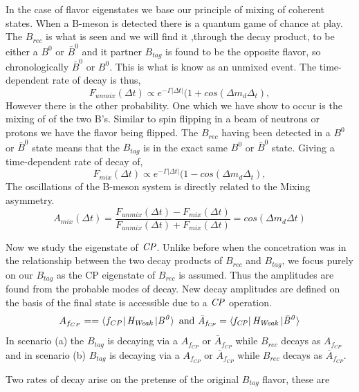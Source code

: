 \documentclass[floatfix,aps,prd,amsmath,amssymb]{revtex4}
\begin{document}
In the case of flavor eigenstates we base our principle of mixing of coherent states. When a B-meson is detected there is a quantum game of chance at play. The $B_{rec}$ is what is seen and we will find it ,through the decay product, to be either a $B^0$ or $\bar{B}^0$ and it partner $B_{tag}$ is found to be the opposite flavor, so  chronologically $\bar{B}^0$ or $B^0$. This is what is know as an unmixed event. The time-dependent rate of decay is thus,
\[F_{unmix}(\Delta t) \propto e^{-\Gamma\left|\Delta t\right|}(1 + cos(\Delta m_d \Delta_t),\]
However there is the other probability. One which we have show to occur is the mixing of of the two B's. Similar to spin flipping in a beam of neutrons or protons we have the flavor being flipped. The $B_{rec}$ having been detected in a $B^0$ or $\bar{B}^0$ state means that the $B_{tag}$ is in the exact same $B^0$ or $\bar{B}^0$ state. Giving a time-dependent rate of decay of,
\[F_{mix}(\Delta t) \propto e^{-\Gamma\left|\Delta t\right|}(1 - cos(\Delta m_d \Delta_t),\]
The oscillations of the B-meson system is directly related to the Mixing asymmetry.
\[A_{mix}(\Delta t) = \frac{F_{unmix}(\Delta t)-F_{mix}(\Delta t)}{F_{unmix}(\Delta t)+F_{mix}(\Delta t)} = cos(\Delta m_d\Delta t) \]

Now we study the eigenstate of $\it{CP}$. Unlike before when the concetration was in the relationship between the two decay products of $B_{rec}$ and $B_{tag}$, we focus purely on our $B_{tag}$ as the CP eigenstate of $B_{rec}$ is assumed. Thus the amplitudes are found from the probable modes of decay. New decay amplitudes are defined on the basis of the final state is accessible due to a $\it{CP}$ operation.
\[A_{f_{CP}}==\bra{f_{CP}}\it{H_{Weak}}\ket{B^{0}} \mbox{ and } \bar{A}_{f_{CP}}=\bra{f_{CP}}\it{H_{Weak}}\ket{\bar{B}^{0}}\]
In scenario (a) the $B_{tag}$ is decaying via a $A_{f_{CP}}$ or $\bar{A}_{f_{CP}}$ while $B_{rec}$ decays as $A_{f_{CP}}$ and in scenario (b) $B_{tag}$ is decaying via a $A_{f_{CP}}$ or $\bar{A}_{f_{CP}}$ while $B_{rec}$ decays as $\bar{A}_{f_{CP}}$. 

Two rates of decay arise on the pretense of the original $B_{tag}$ flavor, these are
\end{document}
